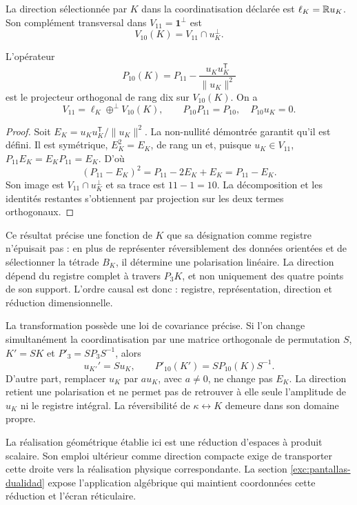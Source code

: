 \begin{definition}
La direction sélectionnée par \(K\) dans la coordinatisation déclarée est
\(\ell_K=\mathbb R u_K\). Son complément transversal dans
\(V_{11}=\mathbf1^\perp\) est
\[
 V_{10}(K)=V_{11}\cap u_K^\perp.
\]
\end{definition}

\begin{proposition}
\label{prop:k-reduccion-diez}
L'opérateur
\begin{equation}
 P_{10}(K)=P_{11}
       -\frac{u_Ku_K^{\mathsf T}}{\lVert u_K\rVert^2}
 \label{eq:k-proyector-diez}
\end{equation}
est le projecteur orthogonal de rang dix sur \(V_{10}(K)\). On a
\[
 V_{11}=\ell_K\mathbin{\oplus^{\perp}}V_{10}(K),
 \qquad P_{10}P_{11}=P_{10},\quad P_{10}u_K=0.
\]
\end{proposition}
\begin{proof}
Soit \(E_K=u_Ku_K^{\mathsf T}/\lVert u_K\rVert^2\). La non-nullité démontrée garantit qu'il est défini. Il est symétrique, \(E_K^2=E_K\), de rang un et, puisque \(u_K\in V_{11}\), \(P_{11}E_K=E_KP_{11}=E_K\). D'où
\[
 (P_{11}-E_K)^2=P_{11}-2E_K+E_K=P_{11}-E_K.
\]
Son image est \(V_{11}\cap u_K^\perp\) et sa trace est
\(11-1=10\). La décomposition et les identités restantes
s'obtiennent par projection sur les deux termes orthogonaux.
\end{proof}

Ce résultat précise une fonction de \(K\) que sa désignation comme
registre n’épuisait pas : en plus de représenter réversiblement des données
orientées et de sélectionner la tétrade \(B_K\), il détermine une
polarisation linéaire. La direction dépend du registre complet à
travers \(P_3K\), et non uniquement des quatre points de son support.
L’ordre causal est donc : registre, représentation,
direction et réduction dimensionnelle.

La transformation possède une loi de covariance précise. Si l'on change
simultanément la coordinatisation par une matrice orthogonale de permutation \(S\),
\(K'=SK\) et \(P'_3=SP_3S^{-1}\), alors
\[
 u_{K'}'=Su_K,\qquad P'_{10}(K')=SP_{10}(K)S^{-1}.
\]
D'autre part, remplacer \(u_K\) par \(a u_K\), avec \(a\ne0\),
ne change pas \(E_K\). La direction retient une polarisation et ne
permet pas de retrouver à elle seule l'amplitude de \(u_K\) ni le
registre intégral. La réversibilité de \(\kappa\leftrightarrow K\)
demeure dans son domaine propre.

La réalisation géométrique établie ici est une réduction d'espaces à produit scalaire. Son emploi ultérieur comme direction compacte exige de transporter cette droite vers la réalisation physique correspondante. La section \ref{exc:pantallas-dualidad} expose l'application algébrique qui maintient coordonnées cette réduction et l'écran réticulaire.
